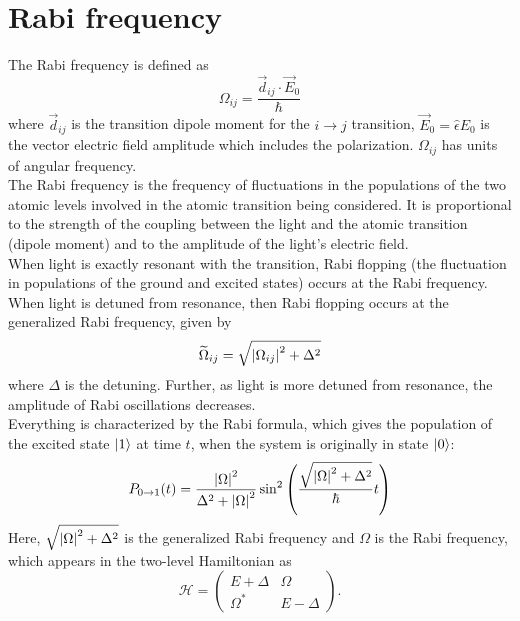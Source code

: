 \documentclass{book}
\theoremstyle{definition}
\newcommand{\ham}{\mathcal{H}}
\newcommand{\f}[2]{\frac{#1}{#2}}
\newcommand{\lp}{\left(}
\newcommand{\rp}{\right)}
\begin{document}
\section*{Rabi frequency}


The Rabi frequency is defined as 
\begin{equation*}
\Omega_{ij} = \f{\vec{d}_{ij}\cdot \vec{E}_0}{\hbar}
\end{equation*}
where $\vec{d}_{ij}$ is the transition dipole moment for the $i\to j$ transition, $\vec{E}_0 = \hat{\epsilon} E_0$ is the vector electric field amplitude which includes the polarization. $\Omega_{ij}$ has units of angular frequency. \\


The Rabi frequency is the frequency of fluctuations in the populations of the two atomic levels involved in the atomic transition being considered. It is proportional to the strength of the coupling between the light and the atomic transition (dipole moment) and to the amplitude of the light's electric field. \\


When light is exactly resonant with the transition, Rabi flopping (the fluctuation in populations of the ground and excited states) occurs at the Rabi frequency. When light is detuned from resonance, then Rabi flopping occurs at the generalized Rabi frequency, given by 
\begin{equation*}
\widetilde{\Omega}_{ij} = \sqrt{\abs{\Omega_{ij}}^2 + \Delta^2}
\end{equation*}
where $\Delta$ is the detuning. Further, as light is more detuned from resonance, the amplitude of Rabi oscillations decreases. \\


Everything is characterized by the Rabi formula, which gives the population of the excited state $\ket{1}$ at time $t$, when the system is originally in state $\ket{0}$:
\begin{equation*}
P_{0\to 1}(t) = \f{\abs{\Omega}^2}{\Delta^2 + \abs{\Omega}^2}\sin^2\lp \f{\sqrt{\abs{\Omega}^2 + \Delta^2}}{\hbar} t \rp
\end{equation*}
Here, $\sqrt{\abs{\Omega}^2 + \Delta^2}$ is the generalized Rabi frequency and $\Omega$ is the Rabi frequency, which appears in the two-level Hamiltonian as
\begin{equation*}
\ham = 
\begin{pmatrix}
E + \Delta & \Omega \\ \Omega^* & E - \Delta
\end{pmatrix}.
\end{equation*}
\end{document}
